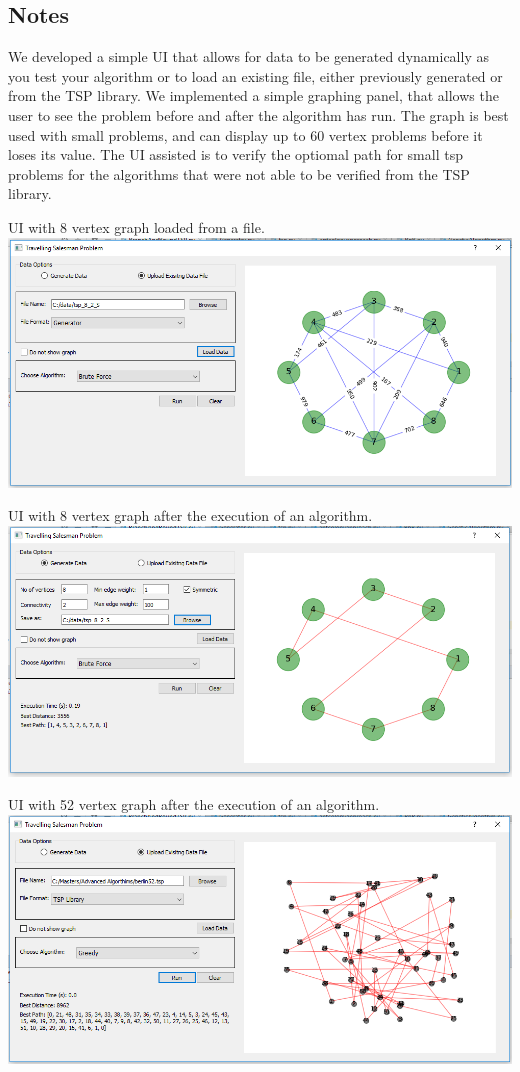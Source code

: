\documentclass[11pt, english]{article}
\begin{document}
\subsection{Notes}
We developed a simple UI that allows for data to be generated dynamically as you test your algorithm or to load an existing file, either previously generated or from the TSP library. 
We implemented a simple graphing panel, that allows the user to see the problem before and after the algorithm has run. The graph is best used with small problems, and can display up to 60 vertex problems before it loses its value.
The UI assisted is to verify the optiomal path for small tsp problems for the algorithms that were not able to be verified from the TSP library.

\begin{center}
UI with 8 vertex graph loaded from a file.
\includegraphics[scale=0.60]{ui2.png}
\end{center}

\begin{center}
UI with 8 vertex graph after the execution of an algorithm.
\includegraphics[scale=0.60]{ui1.png}
\end{center}

\begin{center}
UI with 52 vertex graph after the execution of an algorithm.
\includegraphics[scale=0.60]{ui3.png}
\end{center}




\end{document}
